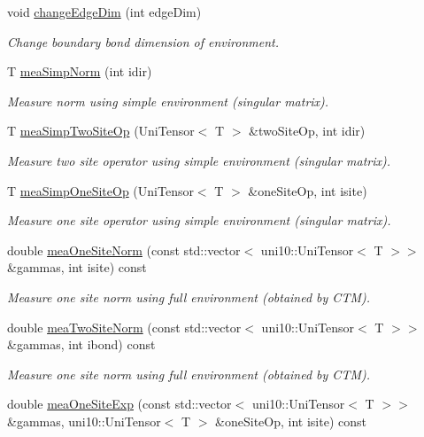 \begin{DoxyCompactItemize}
void \hyperlink{classipeps_a925e76b90c7c205b916fea4184f526f4}{change\+Edge\+Dim} (int edge\+Dim)
\begin{DoxyCompactList}\small\item\em Change boundary bond dimension of environment. \end{DoxyCompactList}\item 
T \hyperlink{classipeps_ae776b33296bd544cfdb7bd4f6666e5aa}{mea\+Simp\+Norm} (int idir)
\begin{DoxyCompactList}\small\item\em Measure norm using simple environment (singular matrix). \end{DoxyCompactList}\item 
T \hyperlink{classipeps_aff1c8f1d4c3b7fc3328ae40e4891ed86}{mea\+Simp\+Two\+Site\+Op} (Uni\+Tensor$<$ T $>$ \&two\+Site\+Op, int idir)
\begin{DoxyCompactList}\small\item\em Measure two site operator using simple environment (singular matrix). \end{DoxyCompactList}\item 
T \hyperlink{classipeps_a641b935ae8a17c7c665090688711d4d8}{mea\+Simp\+One\+Site\+Op} (Uni\+Tensor$<$ T $>$ \&one\+Site\+Op, int isite)
\begin{DoxyCompactList}\small\item\em Measure one site operator using simple environment (singular matrix). \end{DoxyCompactList}\item 
double \hyperlink{classipeps_ad6ec04a17a59b6d2df5990db8e19fbe9}{mea\+One\+Site\+Norm} (const std\+::vector$<$ uni10\+::\+Uni\+Tensor$<$ T $>$$>$ \&gammas, int isite) const 
\begin{DoxyCompactList}\small\item\em Measure one site norm using full environment (obtained by C\+TM). \end{DoxyCompactList}\item 
double \hyperlink{classipeps_ac730740d0e2d5521d6cdd6b5fb4d48db}{mea\+Two\+Site\+Norm} (const std\+::vector$<$ uni10\+::\+Uni\+Tensor$<$ T $>$$>$ \&gammas, int ibond) const 
\begin{DoxyCompactList}\small\item\em Measure one site norm using full environment (obtained by C\+TM). \end{DoxyCompactList}\item 
double \hyperlink{classipeps_a8e1b65e82ab0eeaed1518fd62171e639}{mea\+One\+Site\+Exp} (const std\+::vector$<$ uni10\+::\+Uni\+Tensor$<$ T $>$$>$ \&gammas, uni10\+::\+Uni\+Tensor$<$ T $>$ \&one\+Site\+Op, int isite) const 
$$
\end{DoxyCompactItemize}
